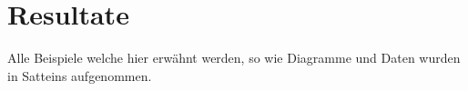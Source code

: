 \section{Resultate}
Alle Beispiele welche hier erwähnt werden, so wie Diagramme und Daten wurden in Satteins aufgenommen.




\newpage
